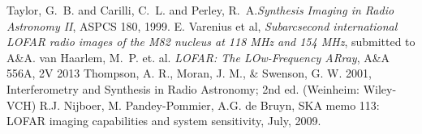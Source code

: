 \documentclass[twoside]{report}
\begin{document}



\begin{thebibliography}{1}
 {Taylor}, G.~B. and {Carilli}, C.~L. and {Perley}, R.~A.{\em Synthesis Imaging in Radio Astronomy II}, ASPCS 180, 1999.
 E. Varenius et al, {\em Subarcsecond international LOFAR radio images of the M82 nucleus at 118 MHz and 154 MHz}, submitted to A\&A.
 {van Haarlem}, M.~P.  et. al. {\em LOFAR: The LOw-Frequency ARray}, A\&A 556A, 2V 2013
 Thompson, A. R., Moran, J. M., \& Swenson, G. W. 2001, Interferometry and Synthesis in Radio Astronomy; 2nd ed. (Weinheim: Wiley-VCH)
R.J. Nijboer, M. Pandey-Pommier, A.G. de Bruyn, SKA memo 113: LOFAR imaging capabilities and system sensitivity, July, 2009.

\end{thebibliography}
\end{document}
